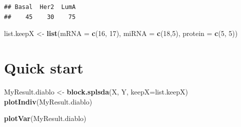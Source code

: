 \documentclass[]{book}
\newenvironment{Shaded}{\begin{snugshade}}{\end{snugshade}}
\newcommand{\KeywordTok}[1]{\textcolor[rgb]{0.13,0.29,0.53}{\textbf{#1}}}
\newcommand{\DataTypeTok}[1]{\textcolor[rgb]{0.13,0.29,0.53}{#1}}
\newcommand{\DecValTok}[1]{\textcolor[rgb]{0.00,0.00,0.81}{#1}}
\newcommand{\StringTok}[1]{\textcolor[rgb]{0.31,0.60,0.02}{#1}}
\newcommand{\CommentTok}[1]{\textcolor[rgb]{0.56,0.35,0.01}{\textit{#1}}}
\newcommand{\OperatorTok}[1]{\textcolor[rgb]{0.81,0.36,0.00}{\textbf{#1}}}
\newcommand{\NormalTok}[1]{#1}
\theoremstyle{definition}
\theoremstyle{definition}
\theoremstyle{definition}
\theoremstyle{remark}
\begin{document}
\begin{Shaded}
\end{Shaded}

\begin{verbatim}
## Basal  Her2  LumA 
##    45    30    75
\end{verbatim}

\begin{Shaded}
\begin{Highlighting}[]
\NormalTok{list.keepX <-}\StringTok{ }\KeywordTok{list}\NormalTok{(}\DataTypeTok{mRNA =} \KeywordTok{c}\NormalTok{(}\DecValTok{16}\NormalTok{, }\DecValTok{17}\NormalTok{), }\DataTypeTok{miRNA =} \KeywordTok{c}\NormalTok{(}\DecValTok{18}\NormalTok{,}\DecValTok{5}\NormalTok{), }\DataTypeTok{protein =} \KeywordTok{c}\NormalTok{(}\DecValTok{5}\NormalTok{, }\DecValTok{5}\NormalTok{))}
\end{Highlighting}
\end{Shaded}

\section{Quick start}\label{quick-start-3}

\begin{Shaded}
\begin{Highlighting}[]
\NormalTok{MyResult.diablo <-}\StringTok{ }\KeywordTok{block.splsda}\NormalTok{(X, Y, }\DataTypeTok{keepX=}\NormalTok{list.keepX)}
\KeywordTok{plotIndiv}\NormalTok{(MyResult.diablo)}
\end{Highlighting}
\end{Shaded}

\begin{Shaded}
\begin{Highlighting}[]
\KeywordTok{plotVar}\NormalTok{(MyResult.diablo)}
\end{Highlighting}
\end{Shaded}
\end{document}
